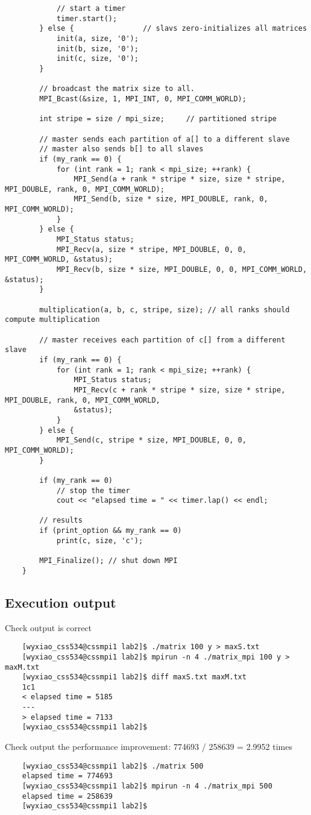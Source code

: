\documentclass[11pt, letterpaper]{article}
\begin{document}
\begin{lstlisting}
			// start a timer
			timer.start();
		} else {                // slavs zero-initializes all matrices
			init(a, size, '0');
			init(b, size, '0');
			init(c, size, '0');
		}
		
		// broadcast the matrix size to all.
		MPI_Bcast(&size, 1, MPI_INT, 0, MPI_COMM_WORLD);
		
		int stripe = size / mpi_size;     // partitioned stripe
		
		// master sends each partition of a[] to a different slave
		// master also sends b[] to all slaves
		if (my_rank == 0) {
			for (int rank = 1; rank < mpi_size; ++rank) {
				MPI_Send(a + rank * stripe * size, size * stripe, MPI_DOUBLE, rank, 0, MPI_COMM_WORLD);
				MPI_Send(b, size * size, MPI_DOUBLE, rank, 0, MPI_COMM_WORLD);
			}
		} else {
			MPI_Status status;
			MPI_Recv(a, size * stripe, MPI_DOUBLE, 0, 0, MPI_COMM_WORLD, &status);
			MPI_Recv(b, size * size, MPI_DOUBLE, 0, 0, MPI_COMM_WORLD, &status);
		}
		
		multiplication(a, b, c, stripe, size); // all ranks should compute multiplication
		
		// master receives each partition of c[] from a different slave
		if (my_rank == 0) {
			for (int rank = 1; rank < mpi_size; ++rank) {
				MPI_Status status;
				MPI_Recv(c + rank * stripe * size, size * stripe, MPI_DOUBLE, rank, 0, MPI_COMM_WORLD,
				&status);
			}
		} else {
			MPI_Send(c, stripe * size, MPI_DOUBLE, 0, 0, MPI_COMM_WORLD);
		}
		
		if (my_rank == 0)
			// stop the timer
			cout << "elapsed time = " << timer.lap() << endl;
		
		// results
		if (print_option && my_rank == 0)
			print(c, size, 'c');
		
		MPI_Finalize(); // shut down MPI
	}
	\end{lstlisting}
	
	\subsection{Execution output}
	
	\noindent \large Check output is correct
	\vspace{-0.2in}
	\begin{lstlisting}
	[wyxiao_css534@cssmpi1 lab2]$ ./matrix 100 y > maxS.txt
	[wyxiao_css534@cssmpi1 lab2]$ mpirun -n 4 ./matrix_mpi 100 y > maxM.txt
	[wyxiao_css534@cssmpi1 lab2]$ diff maxS.txt maxM.txt
	1c1
	< elapsed time = 5185
	---
	> elapsed time = 7133
	[wyxiao_css534@cssmpi1 lab2]$
	\end{lstlisting}
	
	\noindent \large Check output the performance improvement: 774693 / 258639 = 2.9952 times
	\vspace{-0.2in}
	\begin{lstlisting}
	[wyxiao_css534@cssmpi1 lab2]$ ./matrix 500
	elapsed time = 774693
	[wyxiao_css534@cssmpi1 lab2]$ mpirun -n 4 ./matrix_mpi 500
	elapsed time = 258639
	[wyxiao_css534@cssmpi1 lab2]$
	\end{lstlisting}
	
	
\end{document}
